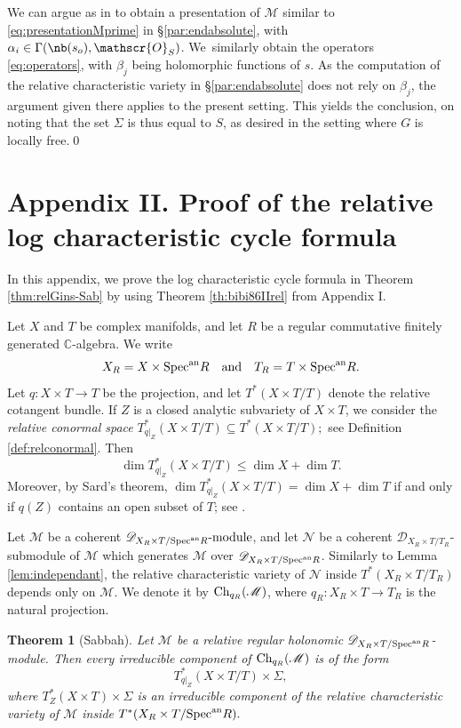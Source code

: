 \documentclass{amsart}
\theoremstyle{plain}
\newtheorem{theorem}{Theorem}
\numberwithin{theorem}{section}
\theoremstyle{definition}
\theoremstyle{remark}
\theoremstyle{definition}
\newcommand{\C}{\mathbb{C}} %
\newcommand{\cM}{\mathcal{M}}
\newcommand{\cO}{\mathscr{O}}
\newcommand{\sM}{\mathscr{M}}
\newcommand{\sN}{\mathscr{N}}
\newcommand{\shD}{\mathscr{D}}
\newcommand{\Specan}{\textup{Spec}^{\textup{an}}}
\newcommand{\Ch}{\textup{Ch}}
\begin{document}
We can argue as in \cite[Step~5 of the proof of Th\,4.15(iii)]{FFS23} to obtain a presentation of $\cM$ similar to \eqref{eq:presentationMprime} in \S\ref{par:endabsolute}, with $\alpha_i\in\Gamma(\nb(s_o),\cO_S)$. We~similarly obtain the operators \eqref{eq:operators}, with $\beta_j$ being holomorphic functions of $s$. As the computation of the relative characteristic variety in \S\ref{par:endabsolute} does not rely on $\beta_j$, the argument given there applies to the present setting. This yields the conclusion, on noting that the set $\Sigma$ is thus equal to $S$, as desired in the setting where $G$ is locally free.\qed


   \part*{Appendix II. Proof of the relative log characteristic cycle formula}
\setcounter{section}{4}   %
\setcounter{theorem}{0}   %
In this appendix, we prove the log characteristic cycle formula in
Theorem \ref{thm:relGins-Sab} by using Theorem \ref{th:bibi86IIrel} from
Appendix I.

Let $X$ and $T$ be complex manifolds, and let $R$ be a regular commutative
finitely generated $\C$-algebra. We write
\[
X_R=X\times \Specan R
\quad \text{and} \quad
T_R=T\times \Specan R.
\]
Let
$q\colon X\times T\to T$
be the projection, and let
$T^*(X\times T/T)$
denote the relative cotangent bundle. If $Z$ is a closed analytic subvariety
of $X\times T$, we consider the \emph{relative conormal space}
$T^*_{q|_Z}(X\times T/T)
\subseteq
T^*(X\times T/T);$
see Definition \ref{def:relconormal}. Then
\[
\dim T^*_{q|_Z}(X\times T/T)\le \dim X+\dim T.
\]
Moreover, by Sard's theorem,
$\dim T^*_{q|_Z}(X\times T/T)=\dim X+\dim T$
if and only if $q(Z)$ contains an open subset of $T$; see \cite[\S 2]{BMM}.

Let $\sM$ be a coherent
$\shD_{X_R\times T/\Specan R}\text{-module}$,
and let $\sN$ be a coherent
$\shD_{X_R\times T/T_R}$-submodule
of $\sM$ which generates $\sM$ over
$\shD_{X_R\times T/\Specan R}$.
Similarly to Lemma \ref{lem:independant}, the relative characteristic variety
of $\sN$ inside
$T^*(X_R\times T/T_R)$
depends only on $\sM$. We denote it by
$\Ch_{q_R}(\sM)$,
where
$q_R\colon X_R\times T\to T_R$
is the natural projection.

\begin{theorem}[Sabbah]\label{thmApp:Sabrelch}
Let $\sM$ be a relative regular holonomic
$\shD_{X_R\times T/\Specan R}$-module. Then every irreducible component of
$\Ch_{q_R}(\sM)$ is of the form
\[
T^*_{q|_Z}(X\times T/T)\times \Sigma,
\]
where
$T^*_Z(X\times T)\times \Sigma$
is an irreducible component of the relative characteristic variety of $\sM$
inside
$T^*(X_R\times T/\Specan R).$
\end{theorem}
\end{document}
